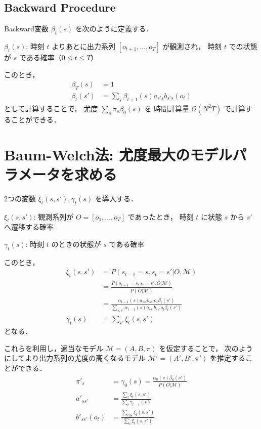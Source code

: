 \documentclass[a4paper, lualatex, ja=standard]{bxjsarticle}
\begin{document}
\subsection{Backward Procedure}

Backward変数 $\beta_{t}(s)$ を次のように定義する．
\begin{dfntcb}
$\beta_{t}(s)$: 時刻 $t$ よりあとに出力系列 $[o_{t+1},\dots,o_{T}]$ が観測され，
時刻 $t$ での状態が $s$ である確率（$0 \leq t \leq T$）
\end{dfntcb}

このとき，
\begin{align*}
\beta_{T}(s) &= 1 \\
\beta_{t}(s') &= \sum_{s}\beta_{t+1}(s)a_{s's}b_{s's}(o_{t})
\end{align*}
として計算することで，
尤度 $\sum_{s}\pi_{s}\beta_{0}(s)$ を
時間計算量 $\mathcal{O}(N^{2} T)$ で計算することができる．

\section{Baum-Welch法: 尤度最大のモデルパラメータを求める}

2つの変数 $\xi_{t}(s,s'), \gamma_{t}(s)$ を導入する．
\begin{dfntcb}
$\xi_{t}(s,s')$: 観測系列が $O=[o_{1},\dots,o_{T}]$ であったとき，
時刻 $t$ に状態 $s$ から $s'$ へ遷移する確率

$\gamma_{t}(s)$: 時刻 $t$ のときの状態が $s$ である確率
\end{dfntcb}

このとき，
\begin{align*}
\xi_{t}(s,s') &= P(s_{t-1}=s,s_{t}=s'|O,\mathcal{M}) \\
&= \frac{P(s_{t-1}=s,s_{t}=s',O|\mathcal{M})}{P(O|\mathcal{M})} \\
&= \frac{\alpha_{t-1}(s)a_{ss'}b_{ss'}o_{t}\beta_{t}(s')}
        {\sum_{s,s'}\alpha_{t-1}(s)a_{ss'}b_{ss'}o_{t}\beta_{t}(s')} \\
\gamma_{t}(s) &= \sum_{s'}\xi_{t}(s,s')
\end{align*}
となる．

これらを利用し，適当なモデル $\mathcal{M}=(A,B,\pi)$ を仮定することで，
次のようにしてより出力系列の尤度の高くなるモデル
$\mathcal{M'}=(A',B',\pi')$ を推定することができる．
\begin{align*}
\pi'_{s} &=\gamma_{0}(s)=\frac{\alpha_{0}(s)\beta_{0}(s')}{P(O|\mathcal{M})} \\
a'_{ss'} &=\frac{\sum_{t}\xi_{t}(s,s')}{\sum_{t}\gamma_{t-1}(s)} \\
b'_{ss'}(o_{t}) &=\frac{\sum_{t|o_t}\xi_{t}(s,s')}{\sum_{t}\xi_{t}(s,s')}
\end{align*}
\end{document}
